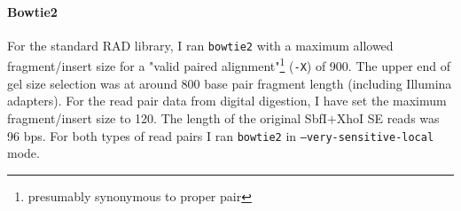 \documentclass[a4paper,12pt,times,authoryear,twoside,print,index]{Classes/PhDThesisPSnPDF}\usepackage[]{graphicx}\usepackage[]{color}
\begin{document}
%
%
%

\paragraph{Bowtie2}
For the standard RAD library, I ran \texttt{bowtie2} with a maximum allowed fragment/insert size for a "valid paired alignment"\footnote{presumably synonymous to \gls{proper pair}} (\texttt{-X}) of 900. The upper end of gel size selection was at around 800 base pair fragment length (including Illumina adapters). For the read pair data from digital digestion,  I have set the maximum fragment/insert size to 120. The length of the original SbfI$+$XhoI SE reads was 96 \glspl{bp}. For both types of read pairs I ran \texttt{bowtie2} in \texttt{--very-sensitive-local} mode.

%
%
%
\end{document}
